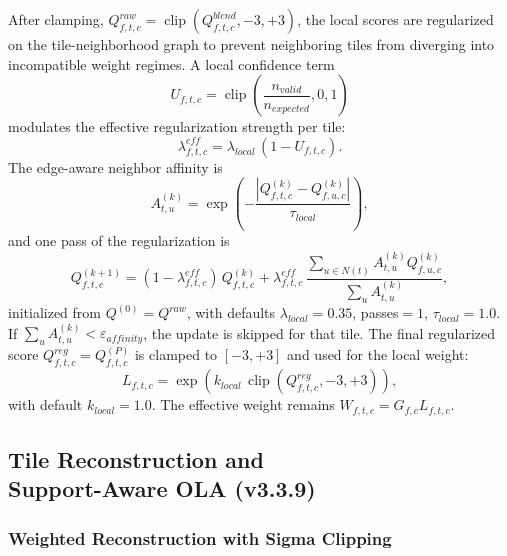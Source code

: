 \documentclass[10pt,twocolumn]{article}
\begin{document}
After clamping, $Q_{f,t,c}^{raw}=\operatorname{clip}(Q_{f,t,c}^{blend},-3,+3)$, the local scores
are regularized on the tile-neighborhood graph to prevent neighboring tiles from diverging into
incompatible weight regimes. A local confidence term
\begin{equation}
  U_{f,t,c} = \operatorname{clip}\!\left(\frac{n_{valid}}{n_{expected}},0,1\right)
\end{equation}
modulates the effective regularization strength per tile:
\begin{equation}
  \lambda_{f,t,c}^{eff} = \lambda_{local}\,(1-U_{f,t,c}).
\end{equation}
The edge-aware neighbor affinity is
\begin{equation}
  A_{t,u}^{(k)} = \exp\!\left(-\frac{|Q_{f,t,c}^{(k)}-Q_{f,u,c}^{(k)}|}{\tau_{local}}\right),
\end{equation}
and one pass of the regularization is
\begin{equation}
  Q_{f,t,c}^{(k+1)} = (1-\lambda_{f,t,c}^{eff})\,Q_{f,t,c}^{(k)}
  + \lambda_{f,t,c}^{eff}\,\frac{\sum_{u\in N(t)} A_{t,u}^{(k)} Q_{f,u,c}^{(k)}}{\sum_u A_{t,u}^{(k)}},
\end{equation}
initialized from $Q^{(0)}=Q^{raw}$, with defaults $\lambda_{local}=0.35$, passes$=1$,
$\tau_{local}=1.0$. If $\sum_u A_{t,u}^{(k)}<\varepsilon_{affinity}$, the update is skipped
for that tile. The final regularized score $Q_{f,t,c}^{reg}=Q_{f,t,c}^{(P)}$ is clamped to
$[-3,+3]$ and used for the local weight:
\begin{equation}
  L_{f,t,c} = \exp(k_{local}\,\operatorname{clip}(Q_{f,t,c}^{reg},-3,+3)),
\end{equation}
with default $k_{local}=1.0$. The effective weight remains $W_{f,t,c}=G_{f,c}L_{f,t,c}$.

\subsection{Tile Reconstruction and \protect \\Support-Aware OLA (v3.3.9)}

\subsubsection{Weighted Reconstruction with Sigma Clipping}
\end{document}
